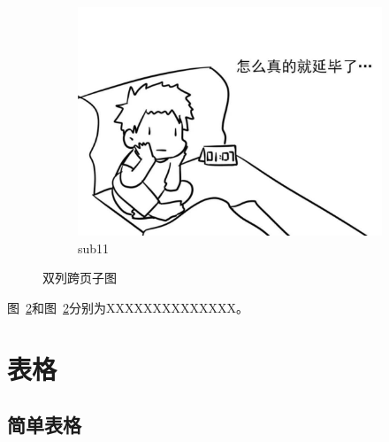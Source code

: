 \begin{figure}[!ht]\ContinuedFloat \centering
	\begin{subfigure}[b]{0.7\textwidth}\centering
		\includegraphics[width=\textwidth]{./Graphs/example/example_2.jpeg}
		\caption{sub11}\label{subf::sub11}
	\end{subfigure}
	\caption{双列跨页子图}
	\label{fig::dual_col_subfigs}
\end{figure}
\FloatBarrier


图~\ref{fig::dual_col_subfigs}和图~\ref{fig::dual_col_subfigs}分别为XXXXXXXXXXXXXX。

\section{表格}

\subsection{简单表格}

